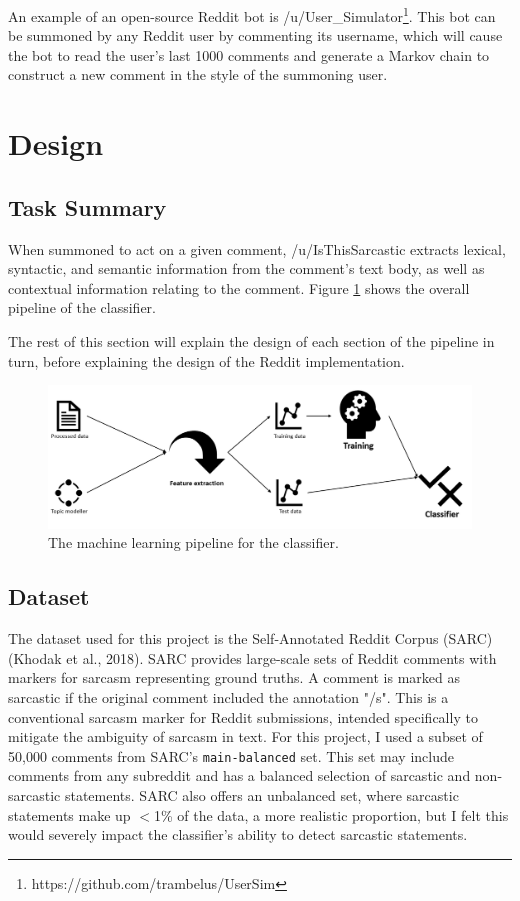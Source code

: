 \documentclass[a4paper,12pt]{article}
\begin{document}
An example of an open-source Reddit bot is /u/User\_Simulator\footnote{https://github.com/trambelus/UserSim}. This bot can be summoned by any Reddit user by commenting its username, which will cause the bot to read the user's last 1000 comments and generate a Markov chain to construct a new comment in the style of the summoning user.

\section{Design}
\subsection{Task Summary}
When summoned to act on a given comment, /u/IsThisSarcastic extracts lexical, syntactic, and semantic information from the comment's text body, as well as contextual information relating to the comment. Figure \ref{fig:cmd1} shows the overall pipeline of the classifier.

The rest of this section will explain the design of each section of the pipeline in turn, before explaining the design of the Reddit implementation.

\begin{figure}[h!]
\includegraphics[width=\linewidth]{Figures/pipeline.png}
\caption{The machine learning pipeline for the classifier.}
\label{fig:cmd1}
\end{figure}

\subsection{Dataset}
The dataset used for this project is the Self-Annotated Reddit Corpus (SARC) (Khodak et al., 2018). SARC provides large-scale sets of Reddit comments with markers for sarcasm representing ground truths. A comment is marked as sarcastic if the original comment included the annotation "/s". This is a conventional sarcasm marker for Reddit submissions, intended specifically to mitigate the ambiguity of sarcasm in text. For this project, I used a subset of 50,000 comments from SARC's \texttt{main-balanced} set. This set may include comments from any subreddit and has a balanced selection of sarcastic and non-sarcastic statements. SARC also offers an unbalanced set, where sarcastic statements make up $<$1\% of the data, a more realistic proportion, but I felt this would severely impact the classifier's ability to detect sarcastic statements.
\end{document}
